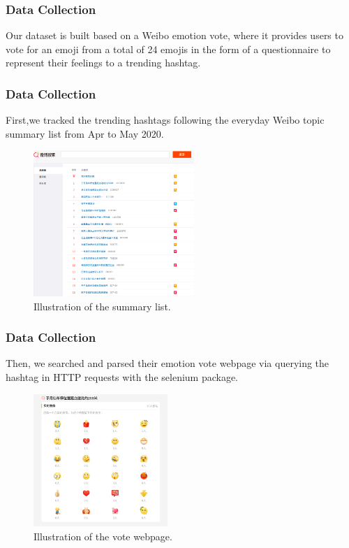 \documentclass[10pt,aspectratio=43]{beamer}
\begin{document}
    \begin{frame}
        \frametitle{\textbf{Data Collection}}
            Our dataset is built based on a Weibo emotion vote, where it provides users to vote for an emoji from a total of 24 emojis in the form of a questionnaire to represent their feelings to a trending hashtag.
    \end{frame}

    \begin{frame}
        \frametitle{\textbf{Data Collection}}
        First,we tracked the trending hashtags following the everyday Weibo topic summary list from Apr to May 2020.
        \begin{figure}
            \centering
            \includegraphics[width=2.4in]{figures/summary.png}
            \caption{Illustration of the summary list.}
            \label{fig:summary}
        \end{figure}
    \end{frame}

    \begin{frame}
        \frametitle{\textbf{Data Collection}}
        Then, we searched and parsed their emotion vote webpage via querying the hashtag in HTTP requests with the selenium package.
        \begin{figure}
            \centering
            \includegraphics[width=2in]{figures/vote.png}
            \caption{Illustration of the vote webpage.}
            \label{fig:vote}
        \end{figure}
    \end{frame}
    
\end{document}

